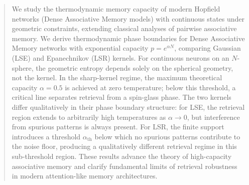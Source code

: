 \documentclass{article}
\theoremstyle{plain}
\theoremstyle{definition}
\theoremstyle{remark}
\begin{document}
\printAffiliationsAndNotice{}  %

\begin{abstract}
We study the thermodynamic memory capacity of modern Hopfield networks (Dense Associative Memory models) with continuous states under geometric constraints, extending classical analyses of pairwise associative memory. We derive thermodynamic phase boundaries for Dense Associative Memory networks with exponential capacity $p = e^{\alpha N}$, comparing Gaussian (LSE) and Epanechnikov (LSR) kernels. For continuous neurons on an $N$-sphere, the geometric entropy depends solely on the spherical geometry, not the kernel. In the sharp-kernel regime, the maximum theoretical capacity $\alpha = 0.5$ is achieved at zero temperature; below this threshold, a critical line separates retrieval from a spin-glass phase. The two kernels differ qualitatively in their phase boundary structure: for LSE, the retrieval region extends to arbitrarily high temperatures as $\alpha \to 0$, but interference from spurious patterns is always present. For LSR, the finite support introduces a threshold $\alpha_{\text{th}}$ below which no spurious patterns contribute to the noise floor, producing a qualitatively different retrieval regime in this sub-threshold region. These results advance the theory of high-capacity associative memory and clarify fundamental limits of retrieval robustness in modern attention-like memory architectures.
\end{abstract}
\end{document}
